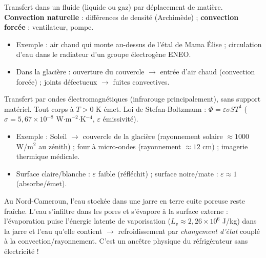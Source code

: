 \documentclass[11pt]{article}
\newcommand{\cle}[1]{{\popxbold\color{popdark}#1}}
\begin{document}
\begin{propriete}[Convection]
Transfert dans un \cle{fluide} (liquide ou gaz) par déplacement de matière. \textbf{Convection naturelle} : différences de densité (Archimède) ; \textbf{convection forcée} : ventilateur, pompe.
\begin{itemize}
\item Exemple : air chaud qui monte au-dessus de l'étal de Mama Élise ; circulation d'eau dans le radiateur d'un groupe électrogène ENEO.
\item Dans la glacière : ouverture du couvercle $\rightarrow$ entrée d'air chaud (convection forcée) ; joints défectueux $\rightarrow$ fuites convectives.
\end{itemize}
\end{propriete}

\begin{propriete}
Transfert par \cle{ondes électromagnétiques} (infrarouge principalement), sans support matériel. Tout corps à $T>0$ K émet. Loi de Stefan-Boltzmann : $\Phi = \varepsilon \sigma S T^4$ ($\sigma = 5,67\times10^{-8}$ W$\cdot$m$^{-2}$$\cdot$K$^{-4}$, $\varepsilon$ émissivité).
\begin{itemize}
\item Exemple : Soleil $\rightarrow$ couvercle de la glacière (rayonnement solaire $\approx 1000$ W/m$^2$ au zénith) ; four à micro-ondes (rayonnement $\approx 12$ cm) ; imagerie thermique médicale.
\item Surface claire/blanche : $\varepsilon$ faible (réfléchit) ; surface noire/mate : $\varepsilon \approx 1$ (absorbe/émet).
\end{itemize}
\end{propriete}

\begin{savaistu}
Au Nord-Cameroun, l'eau stockée dans une jarre en terre cuite poreuse reste fraîche. L'eau s'infiltre dans les pores et s'évapore à la surface externe : l'évaporation puise l'énergie latente de vaporisation ($L_v \approx 2,26\times10^6$ J/kg) dans la jarre et l'eau qu'elle contient $\rightarrow$ refroidissement par \emph{changement d'état} couplé à la convection/rayonnement. C'est un ancêtre physique du réfrigérateur sans électricité !
\end{savaistu}
\end{document}
